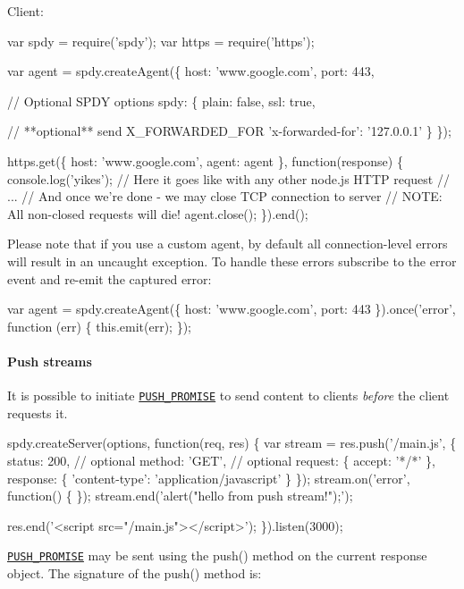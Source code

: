 Client\+: 
\begin{DoxyCode}
var spdy = require('spdy');
var https = require('https');

var agent = spdy.createAgent(\{
  host: 'www.google.com',
  port: 443,

  // Optional SPDY options
  spdy: \{
    plain: false,
    ssl: true,

    // **optional** send X\_FORWARDED\_FOR
    'x-forwarded-for': '127.0.0.1'
  \}
\});

https.get(\{
  host: 'www.google.com',
  agent: agent
\}, function(response) \{
  console.log('yikes');
  // Here it goes like with any other node.js HTTP request
  // ...
  // And once we're done - we may close TCP connection to server
  // NOTE: All non-closed requests will die!
  agent.close();
\}).end();
\end{DoxyCode}


Please note that if you use a custom agent, by default all connection-\/level errors will result in an uncaught exception. To handle these errors subscribe to the {\ttfamily error} event and re-\/emit the captured error\+:


\begin{DoxyCode}
var agent = spdy.createAgent(\{
  host: 'www.google.com',
  port: 443
\}).once('error', function (err) \{
  this.emit(err);
\});
\end{DoxyCode}


\paragraph*{Push streams}

It is possible to initiate \href{https://httpwg.github.io/specs/rfc7540.html#PUSH_PROMISE}{\tt P\+U\+S\+H\+\_\+\+P\+R\+O\+M\+I\+SE} to send content to clients {\itshape before} the client requests it.


\begin{DoxyCode}
spdy.createServer(options, function(req, res) \{
  var stream = res.push('/main.js', \{
    status: 200, // optional
    method: 'GET', // optional
    request: \{
      accept: '*/*'
    \},
    response: \{
      'content-type': 'application/javascript'
    \}
  \});
  stream.on('error', function() \{
  \});
  stream.end('alert("hello from push stream!");');

  res.end('<script src="/main.js"></script>');
\}).listen(3000);
\end{DoxyCode}


\href{https://httpwg.github.io/specs/rfc7540.html#PUSH_PROMISE}{\tt P\+U\+S\+H\+\_\+\+P\+R\+O\+M\+I\+SE} may be sent using the {\ttfamily push()} method on the current response object. The signature of the {\ttfamily push()} method is\+:

